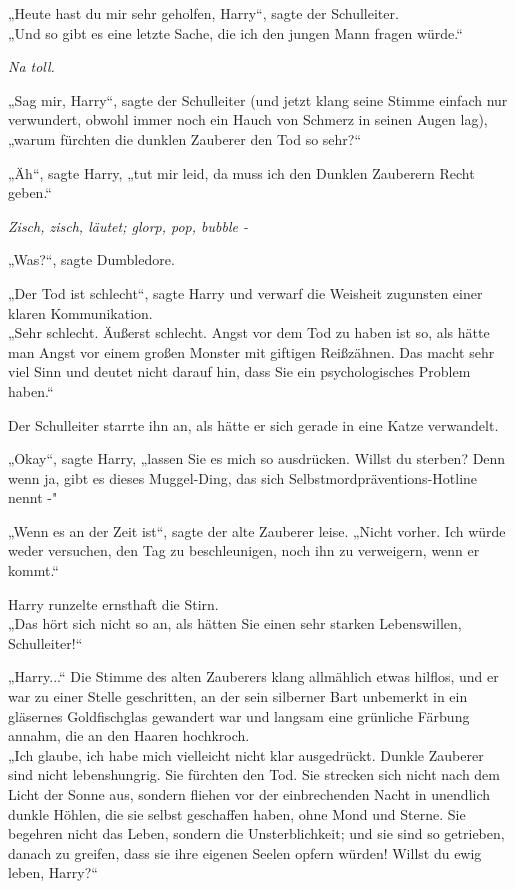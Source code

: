 {„Heute hast du mir sehr geholfen, Harry“, sagte der Schulleiter.\\ „Und so gibt es eine letzte Sache, die ich den jungen Mann fragen würde.“

\emph{Na toll.}

„Sag mir, Harry“, sagte der Schulleiter (und jetzt klang seine Stimme einfach nur verwundert, obwohl immer noch ein Hauch von Schmerz in seinen Augen lag), „warum fürchten die dunklen Zauberer den Tod so sehr?“

„Äh“, sagte Harry, „tut mir leid, da muss ich den Dunklen Zauberern Recht geben.“

\emph{Zisch, zisch, läutet; glorp, pop, bubble -}

„Was?“, sagte Dumbledore.

„Der Tod ist schlecht“, sagte Harry und verwarf die Weisheit zugunsten einer klaren Kommunikation.\\ „Sehr schlecht. Äußerst schlecht. Angst vor dem Tod zu haben ist so, als hätte man Angst vor einem großen Monster mit giftigen Reißzähnen. Das macht sehr viel Sinn und deutet nicht darauf hin, dass Sie ein psychologisches Problem haben.“

Der Schulleiter starrte ihn an, als hätte er sich gerade in eine Katze verwandelt.

„Okay“, sagte Harry, „lassen Sie es mich so ausdrücken. Willst du sterben? Denn wenn ja, gibt es dieses Muggel-Ding, das sich Selbstmordpräventions-Hotline nennt -"

„Wenn es an der Zeit ist“, sagte der alte Zauberer leise. „Nicht vorher. Ich würde weder versuchen, den Tag zu beschleunigen, noch ihn zu verweigern, wenn er kommt.“

Harry runzelte ernsthaft die Stirn.\\ „Das hört sich nicht so an, als hätten Sie einen sehr starken Lebenswillen, Schulleiter!“

„Harry...“ Die Stimme des alten Zauberers klang allmählich etwas hilflos, und er war zu einer Stelle geschritten, an der sein silberner Bart unbemerkt in ein gläsernes Goldfischglas gewandert war und langsam eine grünliche Färbung annahm, die an den Haaren hochkroch.\\ „Ich glaube, ich habe mich vielleicht nicht klar ausgedrückt. Dunkle Zauberer sind nicht lebenshungrig. Sie fürchten den Tod. Sie strecken sich nicht nach dem Licht der Sonne aus, sondern fliehen vor der einbrechenden Nacht in unendlich dunkle Höhlen, die sie selbst geschaffen haben, ohne Mond und Sterne. Sie begehren nicht das Leben, sondern die Unsterblichkeit; und sie sind so getrieben, danach zu greifen, dass sie ihre eigenen Seelen opfern würden! Willst du ewig leben, Harry?“

}
